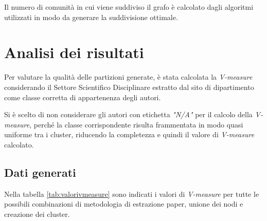 \documentclass[12pt,a4paper,twoside]{report}
\begin{document}
Il numero di comunità in cui viene suddiviso il grafo è calcolato dagli algoritmi utilizzati in modo
da generare la suddivisione ottimale.


\section{Analisi dei risultati} \label{sec:risultati}

Per valutare la qualità delle partizioni generate, è stata calcolata la \textit{V-measure}
considerando il Settore Scientifico Disciplinare estratto dal sito di dipartimento come classe
corretta di appartenenza degli autori.

Si è scelto di non considerare gli autori con etichetta \textit{"N/A"} per il calcolo della
\textit{V-measure}, perché la classe corrispondente risulta frammentata in modo quasi uniforme tra i
cluster, riducendo la completezza e quindi il valore di \textit{V-measure} calcolato.

\subsection{Dati generati}

Nella tabella \ref{tab:valorivmeasure} sono indicati i valori di \textit{V-measure} per tutte le
possibili combinazioni di metodologia di estrazione paper, unione dei nodi e creazione dei cluster.
\end{document}
